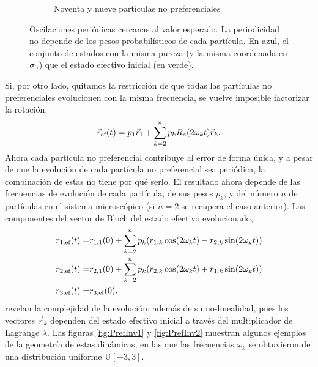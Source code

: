 \begin{figure}[ht!]
\begin{subfigure}{0.5\textwidth}
      \caption{Noventa y nueve partículas no preferenciales}
    \end{subfigure}
    \caption{Oscilaciones periódicas cercanas al valor esperado. La periodicidad no depende de los pesos probabilísticos de cada partícula. En azul, el conjunto de estados con la misma pureza (y la misma coordenada en $\sigma_{3}$) que el estado efectivo inicial (en verde).}\label{fig:OscilationsSameHam}
\end{figure}

Si, por otro lado, quitamos la restricción de que todas las partículas no preferenciales evolucionen con la misma frecuencia, se vuelve imposible factorizar la rotación:
\begin{equation}
    \vec{r}_{\text{ef}}(t)=p_{1}\vec{r}_{1}+\sum_{k=2}^{n} p_{k}R_{z}(2\omega_{k} t)\vec{r}_{k}.\nonumber
\end{equation}
Ahora cada partícula no preferencial contribuye al error de forma única, y a pesar de que la evolución de cada partícula no preferencial sea periódica, la combinación de estas no tiene por qué serlo. El resultado ahora depende de las frecuencias de evolución de cada partícula, de sus pesos $p_{k}$, y del número $n$ de partículas en el sistema microscópico (si $n=2$ se recupera el caso anterior). Las componentes del vector de Bloch del estado efectivo evolucionado,
\begin{align}
    r_{1,\text{ef}}(t)=&r_{1,1}(0)+\sum_{k=2}^{n}p_{k}(r_{1,k}\cos(2\omega_{k} t)-r_{2,k}\sin(2\omega_{k} t))\nonumber\\
    r_{2,\text{ef}}(t)=&r_{2,1}(0)+\sum_{k=2}^{n}p_{k}(r_{2,k}\cos(2\omega_{k} t)+r_{1,k}\sin(2\omega_{k} t))\nonumber\\
    r_{3,\text{ef}}(t)=&r_{3,\text{ef}}(0).\nonumber
\end{align}
revelan la complejidad de la evolución, además de su no-linealidad, pues los vectores $\vec{r}_{k}$ dependen del estado efectivo inicial a través del multiplicador de Lagrange $\lambda.$ Las figuras \ref{fig:PrefInv1} y \ref{fig:PrefInv2} muestran algunos ejemplos de la geometría de estas dinámicas, en las que las frecuencias $\omega_{k}$ se obtuvieron de una distribución uniforme $\text{U}[-3,3]$.

